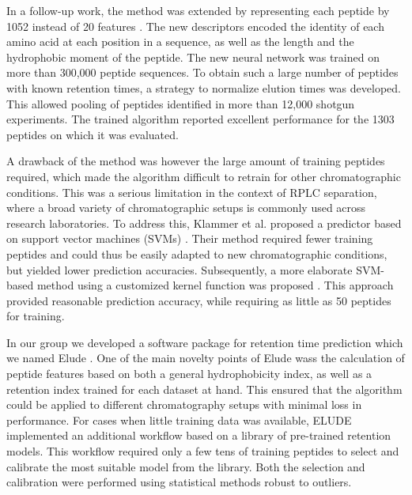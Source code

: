 \documentclass[a4paper]{article}
\begin{document}
In a follow-up work, the method was extended by representing each
 peptide by 1052 instead of 20
 features \cite{petritis2006improved}. The new descriptors encoded the
 identity of each amino acid at each position in a sequence, as well
 as the length and the hydrophobic moment of the peptide. The new
 neural network was trained on more than 300,000 peptide sequences. To
 obtain such a large number of peptides with known retention times, a
 strategy to normalize elution times was developed. This allowed
 pooling of peptides identified in more than 12,000 shotgun
 experiments. The trained algorithm reported excellent performance for
 the 1303 peptides on which it was evaluated.



A drawback of the method was however the large amount of training
peptides required, which made the algorithm difficult to retrain for
other chromatographic conditions. This was a serious limitation in the
context of RPLC separation, where a broad variety of chromatographic
setups is commonly used across research laboratories. To address this,
Klammer et al. proposed a predictor based on support vector machines
(SVMs) \cite{klammer2007improving}. Their method required fewer
training peptides and could thus be easily adapted to new
chromatographic conditions, but yielded lower prediction
accuracies. Subsequently, a more elaborate SVM-based method using a
customized kernel function was proposed \cite{rtpredict, rtpredictImproved}. This
approach provided reasonable prediction accuracy, while requiring as
little as 50 peptides for training.




In our group we developed a software package for retention time prediction which we named {\sc
Elude} \cite{elude1, elude2}. One of the main novelty
points of {\sc Elude} wass the calculation of peptide features based on
both a general hydrophobicity index, as well as a retention index
trained for each dataset at hand. This ensured that the algorithm
could be applied to different chromatography setups with minimal loss
in performance. For cases when little training data was available,
{\sc ELUDE} implemented an additional workflow based on a library of
pre-trained retention models. This workflow required only a few tens
of training peptides to select and calibrate the most suitable model
from the library. Both the selection and calibration were performed
using statistical methods robust to outliers.
\end{document}
